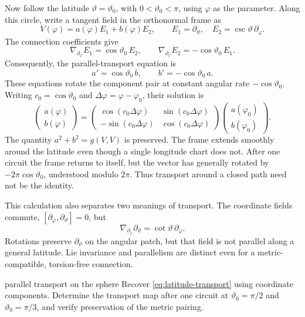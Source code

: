 \documentclass[11pt,a4paper]{article}
\numberwithin{equation}{section}
\begin{document}
Now follow the latitude \(\vartheta=\vartheta_0\), with
\(0<\vartheta_0<\pi\), using \(\varphi\) as the parameter. Along this
circle, write a tangent field in the orthonormal frame as
\[
 V(\varphi)=a(\varphi)E_1+b(\varphi)E_2,
 \qquad E_1=\partial_\vartheta,\quad
 E_2=\csc\vartheta\,\partial_\varphi.
\]
The connection coefficients give
\[
 \nabla_{\partial_\varphi}E_1=\cos\vartheta_0\,E_2,\qquad
 \nabla_{\partial_\varphi}E_2=-\cos\vartheta_0\,E_1.
\]
Consequently, the parallel-transport equation is
\[
 a'=\cos\vartheta_0\,b,\qquad b'=-\cos\vartheta_0\,a.
\]
These equations rotate the component pair at constant angular rate
\(-\cos\vartheta_0\). Writing \(c_0=\cos\vartheta_0\) and
\(\Delta\varphi=\varphi-\varphi_0\), their solution is
\begin{equation}
 \begin{pmatrix}a(\varphi)\\b(\varphi)\end{pmatrix}
 =\begin{pmatrix}
 \cos(c_0\Delta\varphi)&\sin(c_0\Delta\varphi)\\
 -\sin(c_0\Delta\varphi)&\cos(c_0\Delta\varphi)
 \end{pmatrix}
 \begin{pmatrix}a(\varphi_0)\\b(\varphi_0)\end{pmatrix}.
 \label{eq:latitude-transport}
\end{equation}
The quantity \(a^2+b^2=g(V,V)\) is preserved. The frame extends smoothly
around the latitude even though a single longitude chart does not. After
one circuit the frame returns to itself, but the vector has generally
rotated by \(-2\pi\cos\vartheta_0\), understood modulo \(2\pi\).
Thus transport around a closed path need not be the identity.

This calculation also separates two meanings of transport. The coordinate
fields commute, \([\partial_\varphi,\partial_\vartheta]=0\), but
\[
 \nabla_{\partial_\varphi}\partial_\vartheta
 =\cot\vartheta\,\partial_\varphi.
\]
Rotations preserve \(\partial_\vartheta\) on the angular patch, but that field
is not parallel along a general latitude. Lie invariance and parallelism
are distinct even for a metric-compatible, torsion-free connection.

\begin{studentwork}[2.5cm]{parallel transport on the sphere}
Recover \eqref{eq:latitude-transport} using coordinate components.
Determine the transport map after one circuit at
\(\vartheta_0=\pi/2\) and \(\vartheta_0=\pi/3\), and verify
preservation of the metric pairing.
\end{studentwork}
\end{document}
